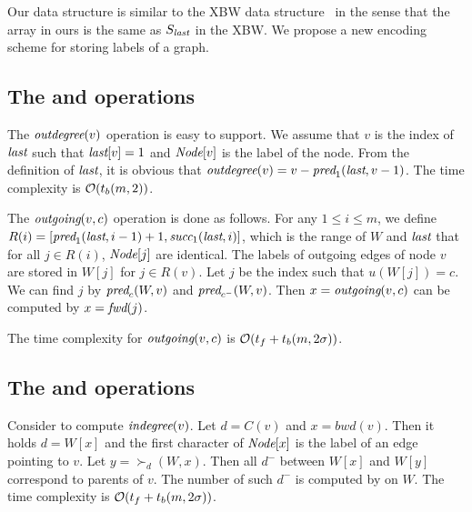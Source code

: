 
Our data structure is similar to the XBW data structure~\cite{FLMM09} in the sense
that the {\last} array in ours is the same as $S_{\textit{last}}$ in the XBW.
We propose a new encoding scheme for storing labels of a graph.


\subsection{The {\cdeg} and {\child} operations}
The ${\textit{outdegree}}(v)$ operation is easy to support.
We assume that $v$ is the index of ${\textit{last}}$ such that ${\textit{last}}[v] = 1$ and
${\textit{Node}}[v]$ is the label of the node.
From the definition of ${\textit{last}}$, it is obvious that 
${\textit{outdegree}}(v) = v - {\textit{pred}}_1({\textit{last}}, v-1)$.
The time complexity is $\mathcal{O}(t_b(m,2))$.

The ${\textit{outgoing}}(v,c)$ operation is done as follows.
For any $1 \le i \le m$, we define $R(i) = [{\textit{pred}}_1({\textit{last}},i-1)+1,{\textit{succ}}_1({\textit{last}},i)]$,
which is the range of $W$ and ${\textit{last}}$ that for all $j \in R(i)$, ${\textit{Node}}[j]$ are identical.
The labels of outgoing edges of node $v$ are stored in $W[j]$ for $j \in R(v)$.
%
Let $j$ be the index such that $u(W[j]) = c$.
We can find $j$ by ${\textit{pred}}_c(W, v)$ and ${\textit{pred}}_{c^-}(W, v)$.
Then $x = {\textit{outgoing}}(v,c)$ can be computed by $x = \textit{fwd}(j)$.

The time complexity for ${\textit{outgoing}}(v,c)$ is 
$\mathcal{O}(t_f + t_b(m, 2\sigma))$.

\subsection{The {\pdeg} and {\parent} operations}
Consider to compute ${\textit{indegree}}(v)$.
Let $d = C(v)$ and $x = bwd(v)$.  Then it holds $d = W[x]$ and the first character
of ${\textit{Node}}[x]$ is the label of an edge pointing to $v$.
Let $y = {\succ}_d(W, x)$.  Then all $d^-$ between $W[x]$ and $W[y]$ correspond
to parents of $v$.  The number of such $d^-$ is computed by {\rank} on $W$.
The time complexity is $\mathcal{O}(t_f + t_b(m,2\sigma))$.

